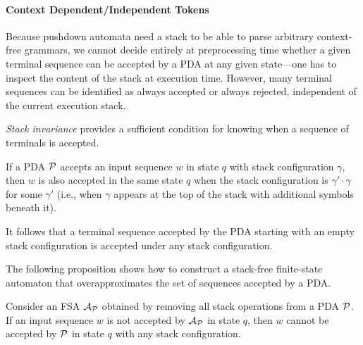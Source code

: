 %




\paragraph{Context Dependent/Independent Tokens}

Because pushdown automata need a stack to be able to parse arbitrary context-free grammars, we cannot decide entirely at preprocessing time whether a given terminal sequence can be accepted by a PDA at any given state---one has to inspect the content of the stack at execution time.
% 
However, many terminal sequences can be identified as always accepted or always rejected, independent of the current execution stack.

\textit{Stack invariance} provides a sufficient condition for knowing when a sequence of terminals is accepted.

\begin{proposition}
If a PDA $\mathcal{P}$ accepts an input sequence $w$ in state $q$ with stack configuration $\gamma$, 
then $w$ is also accepted in the same state $q$ when the stack configuration is $\gamma' \cdot \gamma$ for some $\gamma'$ 
(i.e., when $\gamma$ appears at the top of the stack with additional symbols beneath it).
\end{proposition}



It follows that a terminal sequence accepted by the PDA starting with an empty stack configuration is accepted under any stack configuration. 

The following proposition shows how to construct a stack-free finite-state automaton that overapproximates the set of sequences accepted by a PDA.
\begin{proposition}
\label{prop:overapprox-fsa}
Consider an FSA $\mathcal{A}_{\mathcal{P}}$ obtained by removing all stack operations from a PDA $\mathcal{P}$.
If an input sequence $w$ is not accepted by $\mathcal{A}_{\mathcal{P}}$ in state $q$, then $w$ cannot be accepted by $\mathcal{P}$ in state $q$ with any stack configuration.
\end{proposition}

